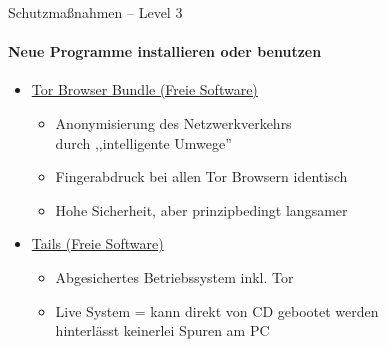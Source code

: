\begin{frame}{Schutzmaßnahmen -- Level 3}
\framesubtitle{Neue Programme installieren oder benutzen}
  \begin{itemize}
    \item \href{https://www.torproject.org}{Tor Browser Bundle (Freie Software)}
    \begin{itemize}
      \item Anonymisierung des Netzwerkverkehrs\\durch ,,intelligente Umwege''
      \item Fingerabdruck bei allen Tor Browsern identisch
      \item Hohe Sicherheit, aber prinzipbedingt langsamer
    \end{itemize}
    \item \href{https://tails.boum.org}{Tails (Freie Software)}
    \begin{itemize}
      \item Abgesichertes Betriebssystem inkl. Tor
      \item Live System = kann direkt von CD gebootet werden\\ hinterlässt keinerlei Spuren am PC
    \end{itemize}
  \end{itemize}
\end{frame}

\endinput
